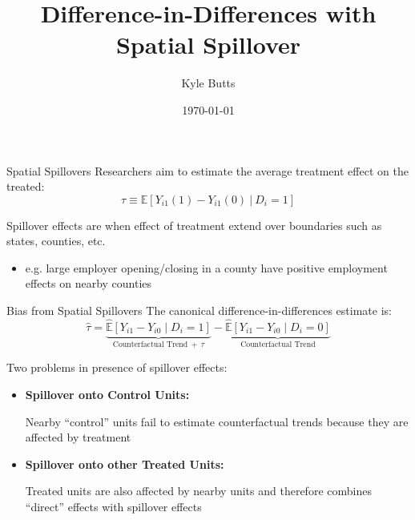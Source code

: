 \documentclass[aspectratio=43]{beamer}
\title{Difference-in-Differences with Spatial Spillover}
\date{\today}
\author{Kyle Butts}
\begin{document}
\maketitle

\begin{frame}{Spatial Spillovers}
    Researchers aim to estimate the average treatment effect on the treated: 
    \[
        \tau \equiv \mathbb{E} \left[ Y_{i1}(1) - Y_{i1}(0) \ \vert \ D_{i} = 1 \right]
    \]
    
    \vspace{5mm}
    Spillover effects are when effect of treatment extend over boundaries such as states, counties, etc.
    
    \begin{itemize}
        \item e.g. large employer opening/closing in a county have positive employment effects on nearby counties
    \end{itemize}
\end{frame}


\begin{frame}{Bias from Spatial Spillovers}
    The canonical difference-in-differences estimate is: 
    \[ 
        \hat{\tau} = \underbrace{\hat{\mathbb{E}} \left[ Y_{i1} - Y_{i0} \mid D_i = 1 \right]}_{\text{Counterfactual Trend} \ + \ \tau} - 
        \underbrace{\hat{\mathbb{E}} \left[ Y_{i1} - Y_{i0} \mid D_i = 0 \right]}_{\text{Counterfactual Trend}}
    \]

    Two problems in presence of spillover effects: 
    \begin{itemize}
        \item \textbf{Spillover onto Control Units:} 
        
        Nearby ``control'' units fail to estimate counterfactual trends because they are affected by treatment
        
        \vspace{2.5mm}
        \item \textbf{Spillover onto other Treated Units:} 
        
        Treated units are also affected by nearby units and therefore combines ``direct'' effects with spillover effects
    \end{itemize}

\end{frame}
\end{document}
